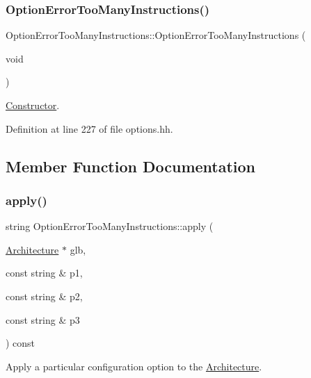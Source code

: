 \subsubsection{\texorpdfstring{OptionErrorTooManyInstructions()}{OptionErrorTooManyInstructions()}}
{\footnotesize\ttfamily Option\+Error\+Too\+Many\+Instructions\+::\+Option\+Error\+Too\+Many\+Instructions (\begin{DoxyParamCaption}\item[{void}]{ }\end{DoxyParamCaption})\hspace{0.3cm}{\ttfamily [inline]}}



\mbox{\hyperlink{class_constructor}{Constructor}}. 



Definition at line 227 of file options.\+hh.



\subsection{Member Function Documentation}
\mbox{\label{class_option_error_too_many_instructions_a6bf25f21e5f63254c9c48acd1b1490e4}} 
\subsubsection{\texorpdfstring{apply()}{apply()}}
{\footnotesize\ttfamily string Option\+Error\+Too\+Many\+Instructions\+::apply (\begin{DoxyParamCaption}\item[{\mbox{\hyperlink{class_architecture}{Architecture}} $\ast$}]{glb,  }\item[{const string \&}]{p1,  }\item[{const string \&}]{p2,  }\item[{const string \&}]{p3 }\end{DoxyParamCaption}) const\hspace{0.3cm}{\ttfamily [virtual]}}



Apply a particular configuration option to the \mbox{\hyperlink{class_architecture}{Architecture}}. 

